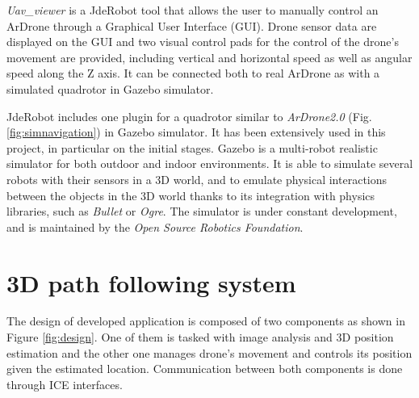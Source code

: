 \documentclass{styles/svproc}
\begin{document}
	\textit{Uav\_viewer} is a JdeRobot tool that allows the user to manually control an ArDrone through a Graphical User Interface (GUI). Drone sensor data are displayed on the GUI and two visual control pads for the control of the drone's movement are provided, including vertical and horizontal speed as well as angular speed along the Z axis. It can be connected both to real ArDrone as with a simulated quadrotor in Gazebo simulator.

        JdeRobot includes one plugin for a quadrotor similar to \textit{ArDrone2.0} (Fig. \ref{fig:simnavigation}) in Gazebo simulator. It has been extensively used in this project, in particular on the initial stages. Gazebo is a multi-robot realistic simulator for both outdoor and indoor environments. It is able to simulate several robots with their sensors in a 3D world, and  
to emulate physical interactions between the objects in the 3D world thanks to its integration with physics libraries, such as \textit{Bullet} or \textit{Ogre}. The simulator is under constant development, and is maintained by the \textit{Open Source Robotics Foundation}. 



\section{3D path following system}


The design of developed application is composed of two components as shown in Figure \ref{fig:design}. One of them is tasked with image analysis and 3D position estimation and the other one manages drone's movement and controls its position given the estimated location. Communication between both components is done through ICE interfaces.
\end{document}
